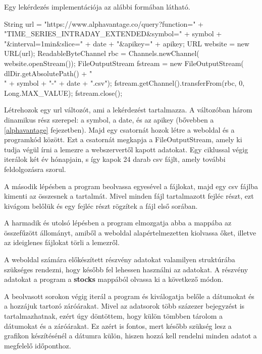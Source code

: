 Egy lekérdezés implementációja az alábbi formában látható.

\begin{java}
String url = "https://www.alphavantage.co/query?function=" +
    "TIME_SERIES_INTRADAY_EXTENDED&symbol=" + symbol +
    "&interval=1min&slice=" + date +
    "&apikey=" + apikey;
URL website = new URL(url);
ReadableByteChannel rbc = Channels.newChannel(
    website.openStream());
FileOutputStream fstream = new FileOutputStream(
    dlDir.getAbsolutePath() + "\\" +
    symbol + "-" + date + ".csv");
fstream.getChannel().transferFrom(rbc, 0, Long.MAX_VALUE);
fstream.close();
\end{java}
Létrehozok egy url változót, ami a lekérdezést tartalmazza. A változóban három dinamikus rész szerepel: a symbol, a date, és az apikey (bővebben a \ref{alphavantage} fejezetben). Majd egy csatornát hozok létre a weboldal és a programkód között. Ezt a csatornát megkapja a FileOutputStream, amely ki tudja végül írni a lemezre a webszervertől kapott adatokat. Egy  ciklussal végig iterálok két év hónapjain, s így kapok 24 darab csv fájlt, amely további feldolgozásra szorul.

A második lépésben a program beolvassa egyesével a fájlokat, majd egy csv fájlba kimenti az összesnek a tartalmát. Mivel minden fájl tartalmazott fejléc részt, ezt kivágom belőlük és egy fejléc részt rögzítek a fájl első sorában.

A harmadik és utolsó lépésben a program elmozgatja abba a mappába az összefűzött állományt, amiből a weboldal alapértelmezetten kiolvassa őket, illetve az ideiglenes fájlokat törli a lemezről.

A weboldal számára előkészített részvény adatokat valamilyen struktúrába szükséges rendezni, hogy később fel lehessen használni az adatokat. A részvény adatokat a program a \textbf{stocks} mappából olvassa ki a következő módon.

\noindent A beolvasott sorokon végig iterál a program és kiválogatja belőle a dátumokat és a hozzájuk tartozó záróárakat. Mivel az adatsorok több százezer bejegyzést is tartalmazhatnak, ezért úgy döntöttem, hogy külön tömbben tárolom a dátumokat és a záróárakat. Ez azért is fontos, mert később szükség lesz a grafikon készítésénél a dátumra külön, hiszen hozzá kell rendelni minden adatot a megfelelő időponthoz.

